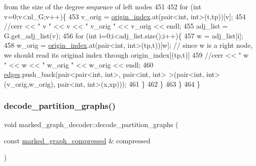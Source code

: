 \begin{DoxyCode}
{       from the size of the degree sequence of left nodes}
451     
452     \textcolor{keywordflow}{for} (\textcolor{keywordtype}{int} v=0;v<nl\_G;v++)\{
453       v\_orig = \hyperlink{classmarked__graph__decoder_aab3e2f6d4376ba96da32f25aa9ddd069}{origin\_index}.at(pair<int, int>(t,tp))[v];
454       \textcolor{comment}{//cerr << " v " << v << " v\_orig " << v\_orig << endl;}
455       adj\_list = G.get\_adj\_list(v);
456       \textcolor{keywordflow}{for} (\textcolor{keywordtype}{int} i=0;i<adj\_list.size();i++)\{
457         w = adj\_list[i];
458         w\_orig = \hyperlink{classmarked__graph__decoder_aab3e2f6d4376ba96da32f25aa9ddd069}{origin\_index}.at(pair<int, int>(tp,t))[w]; \textcolor{comment}{// since w is a right node, we
       should read its original index through origin\_index[(tp,t)]}
459         \textcolor{comment}{//cerr << " w " << w << " w\_orig " << w\_orig << endl;}
460         \hyperlink{classmarked__graph__decoder_af9e75da0a495d9c3bdcd169e15e3261e}{edges}.push\_back(pair<pair<int, int>, pair<int, int> >(pair<int, int>(v\_orig,w\_orig), pair<int,
       int>(x,xp)));
461       \}
462     \}
463   \}
464 \}
\end{DoxyCode}
\mbox{\label{classmarked__graph__decoder_a80eb5f68b45ba160b9a00334476b6be7}} 
\subsubsection{\texorpdfstring{decode\+\_\+partition\+\_\+graphs()}{decode\_partition\_graphs()}}
{\footnotesize\ttfamily void marked\+\_\+graph\+\_\+decoder\+::decode\+\_\+partition\+\_\+graphs (\begin{DoxyParamCaption}\item[{const \hyperlink{classmarked__graph__compressed}{marked\+\_\+graph\+\_\+compressed} \&}]{compressed }\end{DoxyParamCaption})\hspace{0.3cm}{\ttfamily [private]}}


